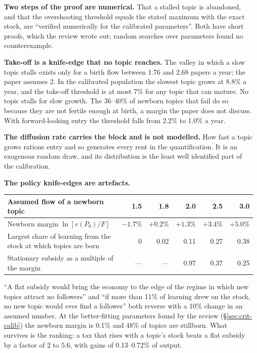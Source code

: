 \textbf{Two steps of the proof are numerical.} That a stalled topic is abandoned, and that the overshooting threshold equals the stated maximum with the exact stock, are ``verified numerically for the calibrated parameters''. Both have short proofs, which the review wrote out; random searches over parameters found no counterexample.

\textbf{Take-off is a knife-edge that no topic reaches.} The valley in which a slow topic stalls exists only for a birth flow between 1.76 and 2.68 papers a year; the paper assumes 2. In the calibrated population the slowest topic grows at 8.8\% a year, and the take-off threshold is at most 7\% for any topic that can mature. No topic stalls for slow growth. The 36--40\% of newborn topics that fail do so because they are not fertile enough at birth, a margin the paper does not discuss. With forward-looking entry the threshold falls from 2.2\% to 1.0\% a year.

\textbf{The diffusion rate carries the block and is not modelled.} How fast a topic grows rations entry and so generates every rent in the quantification. It is an exogenous random draw, and its distribution is the least well identified part of the calibration.

\textbf{The policy knife-edges are artefacts.}

\begin{center}\small
\begin{tabularx}{0.86\textwidth}{@{}Lrrrrr@{}}
\toprule
Assumed flow of a newborn topic & 1.5 & 1.8 & 2.0 & 2.5 & 3.0 \\
\midrule
Newborn margin $\ln[v(P_0)/F]$ & $-1.7\%$ & $+0.2\%$ & $+1.3\%$ & $+3.4\%$ & $+5.0\%$ \\
Largest share of learning from the stock at which topics are born & 0 & 0.02 & 0.11 & 0.27 & 0.38 \\
Stationary subsidy as a multiple of the margin & --- & --- & 0.97 & 0.37 & 0.25 \\
\bottomrule
\end{tabularx}
\end{center}

``A flat subsidy would bring the economy to the edge of the regime in which new topics attract no followers'' and ``if more than 11\% of learning drew on the stock, no new topic would ever find a follower'' both reverse with a 10\% change in an assumed number. At the better-fitting parameters found by the review (\S\ref{sec:crit-calib}) the newborn margin is 0.1\% and 48\% of topics are stillborn. What survives is the ranking: a tax that rises with a topic's stock beats a flat subsidy by a factor of 2 to 5.6, with gains of 0.13--0.72\% of output.


